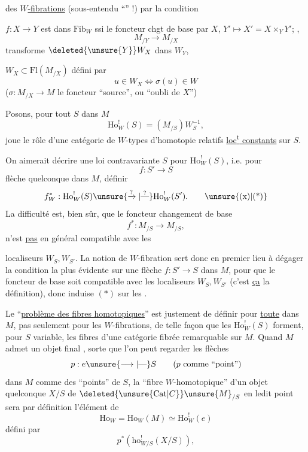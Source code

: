 des \uline{$W$-fibrations} (sous-entendu ``'' !) par la condition

$f:X\to Y$ est dans $\mathrm{Fib}_W$ ssi  le foncteur chgt de base par $X$, $Y'\mapsto X'=X\times_Y Y'$; ,
\[
M_{/Y}\longrightarrow M_{/X}
\]
transforme $\deleted{\unsure{Y}}W_X$ dans $W_Y$,

 \quad $W_X\subset\mathrm{Fl}(M_{/X})$ défini par
\[
u\in W_X\Longleftrightarrow\sigma(u)\in W
\]
($\sigma:M_{/X}\to M$ le foncteur ``source'', ou ``oubli de $X$'')

Posons, pour tout $S$ dans $M$
\[
\mathrm{Ho}^{!}_W(S)=(M_{/S})W_S^{-1},
\]
 joue le rôle d'une catégorie de $W$-types d'homotopie relatifs \uline{loc\textsuperscript{t} constants} sur $S$.

On aimerait décrire une loi contravariante  $S$ pour $\mathrm{Ho}^{!}_W(S)$, i.e. pour
\[
f:S'\longrightarrow S
\]
flèche quelconque dans $M$, définir
\[
f^{*}_W:\mathrm{Ho}^{!}_W(S)\unsure{\xrightarrow{?}|\overset{?}{\text{---}}}\mathrm{Ho}^{!}_W(S').\tag*{\unsure{(x)|(*)}}
\]
La difficulté est, bien sûr, que le foncteur changement de base
\[
f^{*}:M_{/S}\longrightarrow M_{/S},
\]
n'est \uline{pas} en général compatible avec les

localiseurs $W_S,W_{S'}$. La  notion de $W$-fibration sert donc en premier lieu à dégager la condition la plus évidente sur une flèche $f:S'\to S$ dans $M$, pour que  le foncteur  de base  soit compatible avec les localiseurs $W_S,W_{S'}$ (c'est \uline{ça} la définition), donc induise $(*)$ sur les .

Le ``\uline{problème des  fibres homotopiques}'' est justement de définir  pour \uline{toute}  dans $M$, pas seulement pour les $W$-fibrations, de telle façon que les $\mathrm{Ho}^{!}_W(S)$ forment, pour $S$ variable, les fibres d'une catégorie fibrée remarquable sur $M$. Quand $M$ admet un objet final ,  sorte que l'on peut regarder les flèches
\[
p:e\unsure{\longrightarrow|\text{---}}S\qquad\text{($p$ comme ``point'')}
\]
dans $M$ comme des ``points'' de $S$, la ``fibre $W$-homotopique'' d'un objet quelconque $X/S$ de $\deleted{\unsure{\mathrm{Cat}|C}}\unsure{M}_{/S}$ en ledit point sera par définition l'élément de
\[
\mathrm{Ho}_W=\mathrm{Ho}_W(M)\simeq\mathrm{Ho}^{!}_W(e)
\]
défini par
\[
p^*(\mathrm{ho}^{!}_{W/S}(X/S)),
\]

